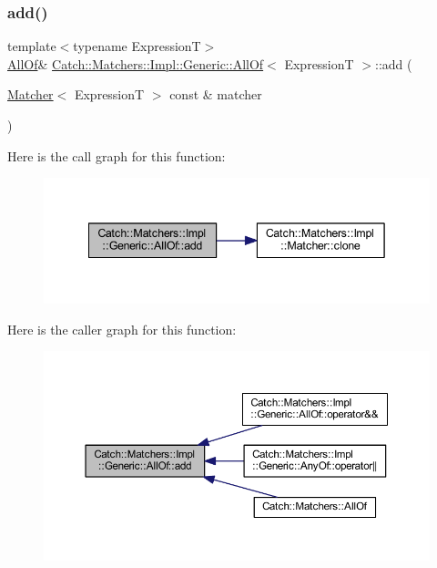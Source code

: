 \subsubsection{\texorpdfstring{add()}{add()}}
{\footnotesize\ttfamily template$<$typename ExpressionT$>$ \\
\hyperlink{class_catch_1_1_matchers_1_1_impl_1_1_generic_1_1_all_of}{All\+Of}\& \hyperlink{class_catch_1_1_matchers_1_1_impl_1_1_generic_1_1_all_of}{Catch\+::\+Matchers\+::\+Impl\+::\+Generic\+::\+All\+Of}$<$ ExpressionT $>$\+::add (\begin{DoxyParamCaption}\item[{\hyperlink{struct_catch_1_1_matchers_1_1_impl_1_1_matcher}{Matcher}$<$ ExpressionT $>$ const \&}]{matcher }\end{DoxyParamCaption})\hspace{0.3cm}{\ttfamily [inline]}}

Here is the call graph for this function\+:\nopagebreak
\begin{figure}[H]
\begin{center}
\leavevmode
\includegraphics[width=342pt]{class_catch_1_1_matchers_1_1_impl_1_1_generic_1_1_all_of_a8c5cd1e494ab697076da418ee72ac297_cgraph}
\end{center}
\end{figure}
Here is the caller graph for this function\+:\nopagebreak
\begin{figure}[H]
\begin{center}
\leavevmode
\includegraphics[width=350pt]{class_catch_1_1_matchers_1_1_impl_1_1_generic_1_1_all_of_a8c5cd1e494ab697076da418ee72ac297_icgraph}
\end{center}
\end{figure}
\hypertarget{class_catch_1_1_matchers_1_1_impl_1_1_generic_1_1_all_of_a95231b6a455e1a646d0b54bce55138be}{}\label{class_catch_1_1_matchers_1_1_impl_1_1_generic_1_1_all_of_a95231b6a455e1a646d0b54bce55138be} 

